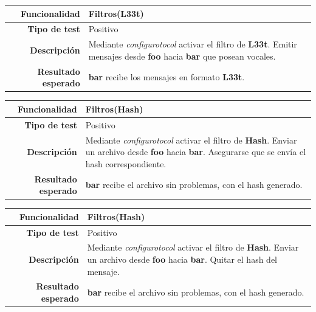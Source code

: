 \documentclass[a4paper,10pt]{article}
\begin{document}
\begin{center}
  \begin{tabular}{|r|p{12.5cm}|}
    \hline
    \textbf{Funcionalidad}	&	Filtros(L33t)\\
    \hline
    \textbf{Tipo de test}	&	Positivo\\
    \hline
    \textbf{Descripción}	&	Mediante \textit{configurotocol} activar el filtro de \textbf{L33t}. 
					Emitir mensajes desde \textbf{foo} hacia \textbf{bar} que posean vocales.\\
    \hline
    \textbf{Resultado esperado}	&	\textbf{bar} recibe los mensajes en formato \textbf{L33t}.\\
    \hline   
  \end{tabular}
\end{center}

\begin{center}
  \begin{tabular}{|r|p{12.5cm}|}
    \hline
    \textbf{Funcionalidad}	&	Filtros(Hash)\\
    \hline
    \textbf{Tipo de test}	&	Positivo\\
    \hline
    \textbf{Descripción}	&	Mediante \textit{configurotocol} activar el filtro de \textbf{Hash}. 
					Enviar un archivo desde \textbf{foo} hacia \textbf{bar}. Asegurarse que 
					se envía el hash correspondiente.\\
    \hline
    \textbf{Resultado esperado}	&	\textbf{bar} recibe el archivo sin problemas, con el hash generado.\\
    \hline   
  \end{tabular}
\end{center}

\begin{center}
  \begin{tabular}{|r|p{12.5cm}|}
    \hline
    \textbf{Funcionalidad}	&	Filtros(Hash)\\
    \hline
    \textbf{Tipo de test}	&	Positivo\\
    \hline
    \textbf{Descripción}	&	Mediante \textit{configurotocol} activar el filtro de \textbf{Hash}. 
					Enviar un archivo desde \textbf{foo} hacia \textbf{bar}. Quitar el hash del mensaje.\\
    \hline
    \textbf{Resultado esperado}	&	\textbf{bar} recibe el archivo sin problemas, con el hash generado.\\
    \hline   
  \end{tabular}
\end{center}
\end{document}
